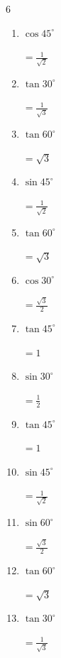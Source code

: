 \begin{multicols}{6}
\begin{enumerate}
  \item $\displaystyle \cos{45^\circ}$

        $\displaystyle =\frac{1}{\sqrt{2}}$

  \item $\displaystyle \tan{30^\circ}$

        $\displaystyle =\frac{1}{\sqrt{3}}$

\columnbreak %

  \item $\displaystyle \tan{60^\circ}$

        $\displaystyle =\sqrt{3}$

  \item $\displaystyle \sin{45^\circ}$

        $\displaystyle =\frac{1}{\sqrt{2}}$

  \item $\displaystyle \tan{60^\circ}$

        $\displaystyle =\sqrt{3}$

  \item $\displaystyle \cos{30^\circ}$

        $\displaystyle =\frac{\sqrt{3}}{2}$

  \item $\displaystyle \tan{45^\circ}$

        $\displaystyle =1$

  \item $\displaystyle \sin{30^\circ}$

        $\displaystyle =\frac{1}{2}$

  \item $\displaystyle \tan{45^\circ}$

        $\displaystyle =1$

  \item $\displaystyle \sin{45^\circ}$

        $\displaystyle =\frac{1}{\sqrt{2}}$

  \item $\displaystyle \sin{60^\circ}$

        $\displaystyle =\frac{\sqrt{3}}{2}$

  \item $\displaystyle \tan{60^\circ}$

        $\displaystyle =\sqrt{3}$

  \item $\displaystyle \tan{30^\circ}$

        $\displaystyle =\frac{1}{\sqrt{3}}$


\end{enumerate}
\end{multicols}
